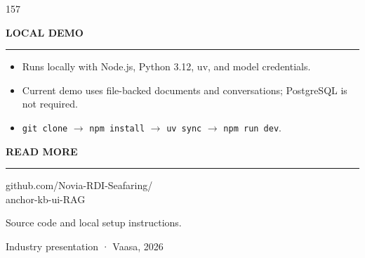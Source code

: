 \documentclass{article}
\newcommand{\panelhead}[1]{%
  \par\addvspace{5mm}%
  {\headingfont\bfseries\fontsize{14pt}{17pt}\selectfont
   \MakeUppercase{#1}\par}%
  \nopagebreak\vspace{1mm}%
  \textcolor{accent}{\rule{32mm}{1.5pt}}\par
  \vspace{1.5mm}%
}
\newcommand{\arr}{\ensuremath{\rightarrow}}
\begin{document}
\begin{textblock}{157}
  \panelhead{Local Demo}
  \begin{itemize}\setlength{\itemsep}{1.5pt}\setlength{\parsep}{1pt}\setlength{\leftmargin}{4mm}
    \item Runs locally with Node.js, Python 3.12, uv, and model credentials.
    \item Current demo uses file-backed documents and conversations; PostgreSQL is not required.
    \item \texttt{git clone} \arr{} \texttt{npm install} \arr{} \texttt{uv sync} \arr{} \texttt{npm run dev}.
  \end{itemize}

  \panelhead{Read more}
  \vspace{1mm}
  \begin{center}
  \end{center}
  \vspace{1mm}
  {\centering\fontsize{9.5pt}{12pt}\selectfont
   github.com/Novia-RDI-Seafaring/\\anchor-kb-ui-RAG\par}
  \vspace{1mm}
  {\centering\fontsize{8.5pt}{11pt}\selectfont\color{panelmuted}
   Source code and local setup instructions.\par}
  \vspace{2mm}
  \vfill
  {\color{panelmuted}\fontsize{8.5pt}{11pt}\selectfont
   Industry presentation · Vaasa, 2026\par}
\end{textblock}
\end{document}
